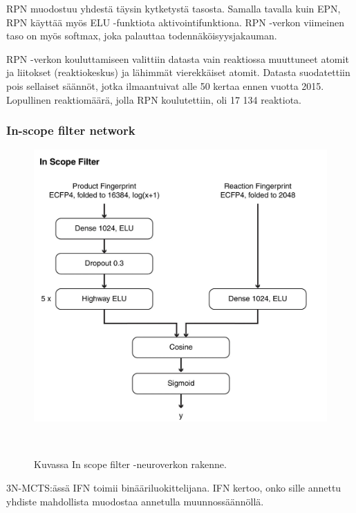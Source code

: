 \documentclass[finnish,twoside,censored,tkt,sw-line]{HYthesisML}
\begin{document}
RPN muodostuu yhdestä täysin kytketystä tasosta.
Samalla tavalla kuin EPN, RPN käyttää myös ELU -funktiota aktivointifunktiona.
RPN -verkon viimeinen taso on myös softmax, joka palauttaa todennäköisyysjakauman.

RPN -verkon kouluttamiseen valittiin datasta vain reaktiossa muuttuneet atomit ja liitokset (reaktiokeskus) ja lähimmät vierekkäiset atomit.
Datasta suodatettiin pois sellaiset säännöt, jotka ilmaantuivat alle 50 kertaa ennen vuotta 2015.
Lopullinen reaktiomäärä, jolla RPN koulutettiin, oli 17 134 reaktiota.

\subsubsection{In-scope filter network}

\begin{figure}[ht]
    \centering
    \includegraphics[]{in-scope-filter.jpg}
    \caption{Kuvassa In scope filter -neuroverkon rakenne.}
    {~\cite{SeglerMarwinHS2018Pcsw}}
\end{figure}


3N-MCTS:ässä IFN toimii binääriluokittelijana.
IFN kertoo, onko sille annettu yhdiste mahdollista muodostaa annetulla muunnossäännöllä.
\end{document}
